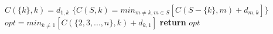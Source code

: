         \State $C(\{k\},k)=d_{1, k}$
    \EndFor
                \State $\{C(S,k)=min_{m \neq k, m \in S}[C(S-\{k\},m)+d_{m, k}]\}$
            \EndFor
        \EndFor
    \EndFor
    \State $opt=min_{k \neq 1}[C(\{2, 3, ..., n\}, k) + d_{k, 1}]$
    \State \textbf{return} $opt$
\EndProcedure